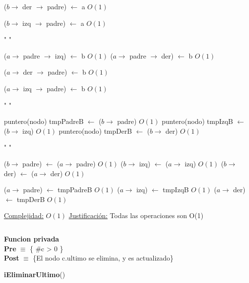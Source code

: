 \begin{Algoritmos}
\begin{algorithm}[H]
\begin{algorithmic}[1]
        \State ($b \to$ der $\to$ padre) $\gets$ a \Comment $O(1)$
    \EndIf

        \State ($b \to$ izq $\to$ padre) $\gets$ a \Comment $O(1)$
    \EndIf

    \State " "

        \State ($a \to$ padre $\to$ izq) $\gets$ b \Comment $O(1)$
    \Else {}
        \State ($a \to$ padre $\to$ der) $\gets$ b \Comment $O(1)$
    \EndIf
    \EndIf

        \State ($a \to$ der $\to$ padre) $\gets$ b \Comment $O(1)$
    \EndIf

        \State ($a \to$ izq $\to$ padre) $\gets$ b \Comment $O(1)$
    \EndIf

    \State " "

    \State puntero(nodo) tmpPadreB $\gets$ ($b \to$ padre) \Comment $O(1)$
    \State puntero(nodo) tmpIzqB $\gets$ ($b \to$ izq) \Comment $O(1)$
    \State puntero(nodo) tmpDerB $\gets$ ($b \to$ der) \Comment $O(1)$

    \State " "

    \State ($b \to$ padre) $\gets$ ($a \to$ padre) \Comment $O(1)$
    \State ($b \to$ izq) $\gets$ ($a \to$ izq) \Comment $O(1)$
    \State ($b \to$ der) $\gets$ ($a \to$ der) \Comment $O(1)$

    \State ($a \to$ padre) $\gets$ tmpPadreB \Comment $O(1)$
    \State ($a \to$ izq) $\gets$ tmpIzqB \Comment $O(1)$
    \State ($a \to$ der) $\gets$ tmpDerB \Comment $O(1)$


    \medskip
    \Statex \underline{Complejidad:} $O(1)$
    \Statex \underline{Justificaci\'on:} Todas las operaciones son O(1)

\end{algorithmic}
\end{algorithm}

$ $\newline

\textbf{Funcion privada}\\
\textbf{Pre} $\equiv$ \{ $\#$c > 0 \}\\%
\textbf{Post} $\equiv$ \{El nodo c.ultimo se elimina, y es actualizado\}%
\begin{algorithm}[H]
{\textbf{iEliminarUltimo}()}
\begin{algorithmic}[1]


\end{algorithmic}
\end{algorithm}
\end{Algoritmos}
